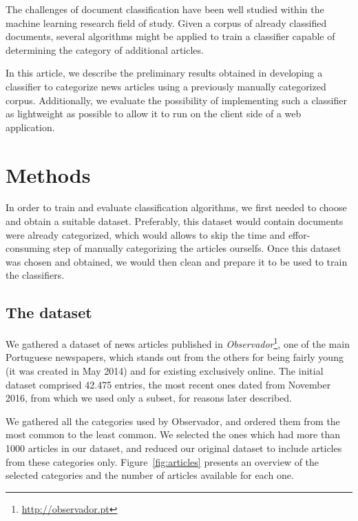 \documentclass[conference]{IEEEtran}
\begin{document}
The challenges of document classification have been well studied
within the machine learning research field of
study\cite{borko1963automatic,sebastiani2002machine,rubin2012statistical}.
Given a corpus of already classified documents, several algorithms
might be applied to train a classifier capable of determining the
category of additional articles.

In this article, we describe the preliminary results obtained in
developing a classifier to categorize news articles using a previously
manually categorized corpus. Additionally, we evaluate the possibility
of implementing such a classifier as lightweight as possible to allow
it to run on the client side of a web application.

\section{Methods}
In order to train and evaluate classification algorithms, we first
needed to choose and obtain a suitable dataset. Preferably, this
dataset would contain documents were already categorized, which would
allows to skip the time and effor-consuming step of manually
categorizing the articles ourselfs. Once this dataset was chosen and
obtained, we would then clean and prepare it to be used to train the
classifiers.

\subsection{The dataset}
We gathered a dataset of news articles published in
\textit{Observador}\footnote{\url{http://observador.pt}}, one of the
main Portuguese newspapers, which stands out from the others for being
fairly young (it was created in May 2014) and for existing exclusively
online. The initial dataset comprised 42.475 entries, the most recent
ones dated from November 2016, from which we used only a subset, for
reasons later described.

We gathered all the categories used by Observador, and ordered them
from the most common to the least common. We selected the ones which
had more than 1000 articles in our dataset, and reduced our original
dataset to include articles from these categories only.
Figure~\ref{fig:articles} presents an overview of the selected
categories and the number of articles available for each one.
\end{document}
